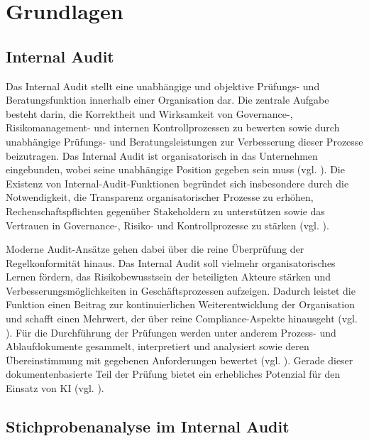 \chapter{Grundlagen}

\section{Internal Audit}

Das Internal Audit stellt eine unabhängige und objektive Prüfungs- und Beratungsfunktion innerhalb einer Organisation dar. Die zentrale Aufgabe besteht darin, die Korrektheit und Wirksamkeit von Governance-, Risikomanagement- und internen Kontrollprozessen zu bewerten sowie durch unabhängige Prüfungs- und Beratungsleistungen zur Verbesserung dieser Prozesse beizutragen. Das Internal Audit ist organisatorisch in das Unternehmen eingebunden, wobei seine unabhängige Position gegeben sein muss (vgl. \cite[S.~12~ff., S. 46]{IIA2024}).
Die Existenz von Internal-Audit-Funktionen begründet sich insbesondere durch die Notwendigkeit, die Transparenz organisatorischer Prozesse zu erhöhen, Rechenschaftspflichten gegenüber Stakeholdern zu unterstützen sowie das Vertrauen in Governance-, Risiko- und Kontrollprozesse zu stärken (vgl. \cite[S.~1]{IIA_BoardRole2023}).

Moderne Audit-Ansätze gehen dabei über die reine Überprüfung der Regelkonformität hinaus. Das Internal Audit soll vielmehr organisatorisches Lernen fördern, das Risikobewusstsein der beteiligten Akteure stärken und Verbesserungsmöglichkeiten in Geschäftsprozessen aufzeigen. Dadurch leistet die Funktion einen Beitrag zur kontinuierlichen Weiterentwicklung der Organisation und schafft einen Mehrwert, der über reine Compliance-Aspekte hinausgeht (vgl. \cite[S.~262 f.]{cantu2025making}). Für die Durchführung der Prüfungen werden unter anderem Prozess- und Ablaufdokumente gesammelt, interpretiert und analysiert sowie deren Übereinstimmung mit gegebenen Anforderungen bewertet (vgl. \cite[S.~556 f.]{ROUSSY2013550}). Gerade dieser dokumentenbasierte Teil der Prüfung bietet ein erhebliches Potenzial für den Einsatz von \ac{KI} (vgl. \cite[S.~1]{schumann2021natural}).

\section{Stichprobenanalyse im Internal Audit}

